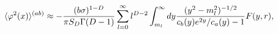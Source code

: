 \begin{equation}
\langle \varphi ^{2}(x)\rangle ^{(ab)}\approx -\frac{(b\sigma )^{1-D}}{%
\pi S_D\Gamma (D-1)}\sum_{l=0}^{\infty }l^{D-2}\int_{m_l}^{\infty
}dy \frac{(y^2-m_l^2)^{-1/2}}{c_b(y)e^{2y}/c_a(y)-1} F(y,r) ,
\label{phi2abtoinf1}
\end{equation}

